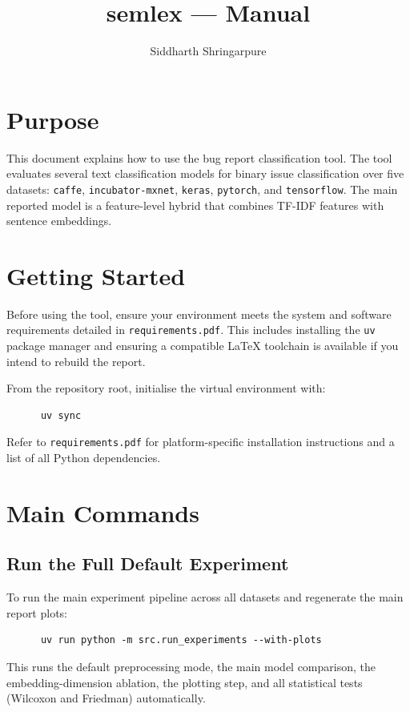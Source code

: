 \documentclass[10pt,a4paper]{article}
\title{semlex --- Manual}
\author{Siddharth Shringarpure}
\date{}
\begin{document}
\singlespacing
\pagestyle{plain}
\maketitle

\section{Purpose}

This document explains how to use the bug report classification tool. The tool evaluates several text classification models for binary issue classification over five datasets: \texttt{caffe}, \texttt{incubator-mxnet}, \texttt{keras},
\texttt{pytorch}, and \texttt{tensorflow}. The main reported model is a feature-level hybrid that combines TF-IDF features with sentence embeddings.


\section{Getting Started}

Before using the tool, ensure your environment meets the system and software requirements detailed in \texttt{requirements.pdf}. This includes installing the \texttt{uv} package manager and ensuring a compatible \LaTeX{} toolchain is available if you intend to rebuild the report.

From the repository root, initialise the virtual environment with:
\begin{verbatim}
      uv sync
\end{verbatim}

Refer to \texttt{requirements.pdf} for platform-specific installation
instructions and a list of all Python dependencies.


\section{Main Commands}

\subsection{Run the Full Default Experiment}
To run the main experiment pipeline across all datasets and regenerate the main
report plots:

\begin{verbatim}
      uv run python -m src.run_experiments --with-plots
\end{verbatim}
This runs the default preprocessing mode, the main model comparison, the
embedding-dimension ablation, the plotting step, and all statistical tests (Wilcoxon and Friedman) automatically.
\end{document}
